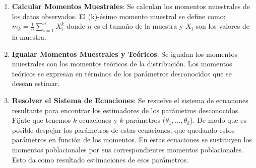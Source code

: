 \documentclass[
  letterpaper,
  DIV=11,
  numbers=noendperiod]{scrreprt}
\begin{document}
\begin{enumerate}
\def\labelenumi{\arabic{enumi}.}
\item
  \textbf{Calcular Momentos Muestrales}: Se calculan los momentos
  muestrales de los datos observados. El (k)-ésimo momento muestral se
  define como: \(m_k = \frac{1}{n} \sum_{i=1}^{n}X_i^k\) donde \(n\) es
  el tamaño de la muestra y \(X_i\) son los valores de la muestra.
\item
  \textbf{Igualar Momentos Muestrales y Teóricos}: Se igualan los
  momentos muestrales con los momentos teóricos de la distribución. Los
  momentos teóricos se expresan en términos de los parámetros
  desconocidos que se desean estimar.
\item
  \textbf{Resolver el Sistema de Ecuaciones}: Se resuelve el sistema de
  ecuaciones resultante para encontrar los estimadores de los parámetros
  desconocidos. Fíjate que tenemos \(k\) ecuaciones y \(k\) parámetros
  (\(\theta_1,\ldots,\theta_k\)). De modo que es posible despejar los
  parámetros de estas ecuaciones, que quedando estos parámetros en
  función de los momentos. En estas ecuaciones se sustituyen los
  momentos poblacionales por sus correspondientes momentos
  poblacionales. Esto da como resultado estimaciones de esos parámetros.
\end{enumerate}
\end{document}
